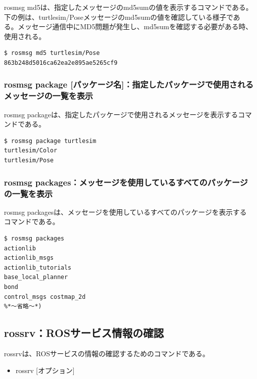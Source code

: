 rosmsg md5は、指定したメッセージのmd5sumの値を表示するコマンドである。下の例は、turtlesim/Poseメッセージのmd5sumの値を確認している様子である。メッセージ通信中にMD5問題が発生し、md5sumを確認する必要がある時、使用される。

\begin{lstlisting}[language=ROS]
$ rosmsg md5 turtlesim/Pose
863b248d5016ca62ea2e895ae5265cf9
\end{lstlisting}

\subsubsection{rosmsg package [パッケージ名]：指定したパッケージで使用されるメッセージの一覧を表示}

rosmsg packageは、指定したパッケージで使用されるメッセージを表示するコマンドである。

\begin{lstlisting}[language=ROS]
$ rosmsg package turtlesim
turtlesim/Color
turtlesim/Pose
\end{lstlisting}

\subsubsection{rosmsg packages：メッセージを使用しているすべてのパッケージの一覧を表示}

rosmsg packagesは、メッセージを使用しているすべてのパッケージを表示するコマンドである。

\begin{lstlisting}[language=ROS]
$ rosmsg packages
actionlib
actionlib_msgs
actionlib_tutorials
base_local_planner
bond
control_msgs costmap_2d
%*〜省略〜*)
\end{lstlisting}

\subsection{rossrv：ROSサービス情報の確認}

rossrvは、ROSサービスの情報の確認するためのコマンドである。

\begin{itemize}
\item rossrv [オプション]
\end{itemize}

